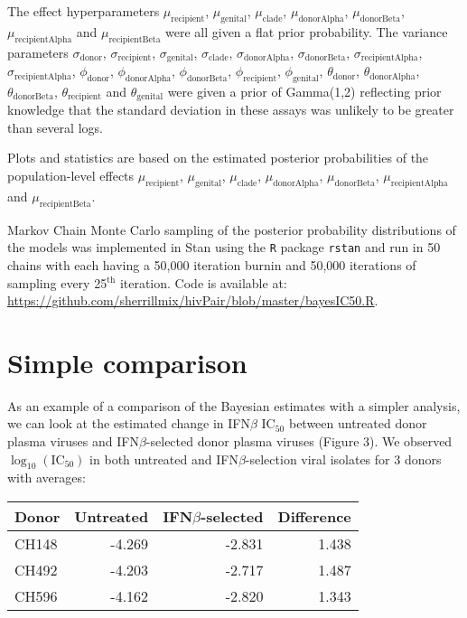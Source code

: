 \documentclass[12pt]{article}
\newcommand{\ifnb}{IFN${\beta}$}
\newcommand{\icFifty}{IC$_{50}$}
\begin{document}
The effect hyperparameters
$\mu_{\text{recipient}}$, $\mu_{\text{genital}}$, $\mu_{\text{clade}}$, $\mu_{\text{donorAlpha}}$, $\mu_{\text{donorBeta}}$, $\mu_{\text{recipientAlpha}}$ and $\mu_{\text{recipientBeta}}$ were all given a flat prior probability.
The variance parameters 
$\sigma_{\text{donor}}$, $\sigma_{\text{recipient}}$, $\sigma_{\text{genital}}$, $\sigma_{\text{clade}}$, $\sigma_{\text{donorAlpha}}$, $\sigma_{\text{donorBeta}}$, $\sigma_{\text{recipientAlpha}}$, $\sigma_{\text{recipientAlpha}}$,
$\phi_{\text{donor}}$, $\phi_{\text{donorAlpha}}$, $\phi_{\text{donorBeta}}$, $\phi_{\text{recipient}}$, $\phi_{\text{genital}}$,
$\theta_{\text{donor}}$, $\theta_{\text{donorAlpha}}$, $\theta_{\text{donorBeta}}$, $\theta_{\text{recipient}}$ and $\theta_{\text{genital}}$ 
were given a prior of Gamma(1,2) reflecting prior knowledge that the standard deviation in these assays was unlikely to be greater than several logs.

Plots and statistics are based on the estimated posterior probabilities of the population-level effects
$\mu_{\text{recipient}}$, $\mu_{\text{genital}}$, $\mu_{\text{clade}}$, $\mu_{\text{donorAlpha}}$, $\mu_{\text{donorBeta}}$, $\mu_{\text{recipientAlpha}}$ and $\mu_{\text{recipientBeta}}$.

Markov Chain Monte Carlo sampling of the posterior probability distributions of the models was implemented in Stan using the \texttt{R} package \texttt{rstan}
  and run in 50 chains with each having a 50,000 iteration burnin and 50,000 iterations of sampling every 25$^{\text{th}}$ iteration.
  Code is available at:\\
  \url{https://github.com/sherrillmix/hivPair/blob/master/bayesIC50.R}.

\section{Simple comparison}
As an example of a comparison of the Bayesian estimates with a simpler analysis, we can look at the estimated change in \ifnb{} \icFifty{} between untreated donor plasma viruses and \ifnb-selected donor plasma viruses (Figure 3). We observed $\log_{10}(\text{\icFifty})$ in both untreated and \ifnb-selection viral isolates for 3 donors with averages:
\begin{table}[ht]
\centering
  \begin{tabular}{|l|r|r|r|}
    \hline
    Donor  & Untreated & \ifnb{}-selected & Difference \\ 
    \hline
    CH148  & -4.269    & -2.831           & 1.438      \\ 
    CH492  & -4.203    & -2.717           & 1.487      \\ 
    CH596  & -4.162    & -2.820           & 1.343      \\ 
    \hline
  \end{tabular}\\
\end{table}
\end{document}

